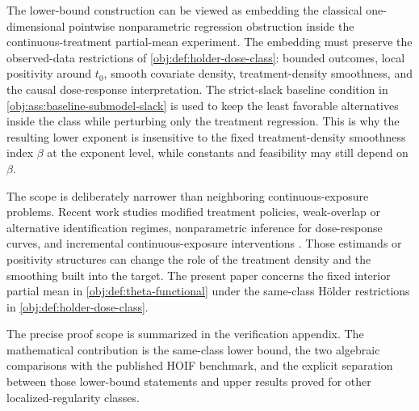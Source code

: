 The lower-bound construction can be viewed as embedding the classical one-dimensional pointwise nonparametric regression obstruction inside the continuous-treatment partial-mean experiment. The embedding must preserve the observed-data restrictions of \cref{obj:def:holder-dose-class}: bounded outcomes, local positivity around \(t_0\), smooth covariate density, treatment-density smoothness, and the causal dose-response interpretation. The strict-slack baseline condition in \cref{obj:ass:baseline-submodel-slack} is used to keep the least favorable alternatives inside the class while perturbing only the treatment regression. This is why the resulting lower exponent is insensitive to the fixed treatment-density smoothness index \(\beta\) at the exponent level, while constants and feasibility may still depend on \(\beta\).

The scope is deliberately narrower than neighboring continuous-exposure problems. Recent work studies modified treatment policies, weak-overlap or alternative identification regimes, nonparametric inference for dose-response curves, and incremental continuous-exposure interventions \citep{hejazi2022,doss2022,hudson2023,shi2024,zhang2024,schindl2024,bonvini2024}. Those estimands or positivity structures can change the role of the treatment density and the smoothing built into the target. The present paper concerns the fixed interior partial mean in \cref{obj:def:theta-functional} under the same-class Hölder restrictions in \cref{obj:def:holder-dose-class}.

The precise proof scope is summarized in the verification appendix. The mathematical contribution is the same-class lower bound, the two algebraic comparisons with the published HOIF benchmark, and the explicit separation between those lower-bound statements and upper results proved for other localized-regularity classes.
